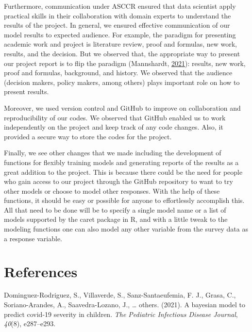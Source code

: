 \documentclass[
  10pt,
]{article}
\begin{document}
Furthermore, communication under ASCCR ensured that data scientist apply practical skills in their collaboration with domain experts to understand the results of the project. In general, we ensured effective communication of our model results to expected audience. For example, the paradigm for presenting academic work and project is literature review, proof and formulas, new work, results, and the decision. But we observed that, the appropriate way to present our project report is to flip the paradigm (Mannshardt, \protect\hyperlink{ref-elizabeth_flip}{2021}): results, new work, proof and formulas, background, and history. We observed that the audience (decision makers, policy makers, among others) plays important role on how to present results.

Moreover, we used version control and GitHub to improve on collaboration and reproducibility of our codes. We observed that GitHub enabled us to work independently on the project and keep track of any code changes. Also, it provided a secure way to store the codes for the project.

Finally, we see other changes that we made including the development of functions for flexibly training models and generating reports of the results as a great addition to the project. This is because there could be the need for people who gain access to our project through the GitHub repository to want to try other models or choose to model other responses. With the help of these functions, it should be easy or possible for anyone to effortlessly accomplish this. All that need to be done will be to specify a single model name or a list of models supported by the caret package in R, and with a little tweak to the modeling functions one can also model any other variable from the survey data as a response variable.

\newpage

\hypertarget{references}{%
\section*{References}\label{references}}

\hypertarget{refs}{}
\leavevmode\hypertarget{ref-dominguez2021bayesian}{}%
Dominguez-Rodriguez, S., Villaverde, S., Sanz-Santaeufemia, F. J., Grasa, C., Soriano-Arandes, A., Saavedra-Lozano, J., \ldots{} others. (2021). A bayesian model to predict covid-19 severity in children. \emph{The Pediatric Infectious Disease Journal}, \emph{40}(8), e287--e293.
\end{document}
